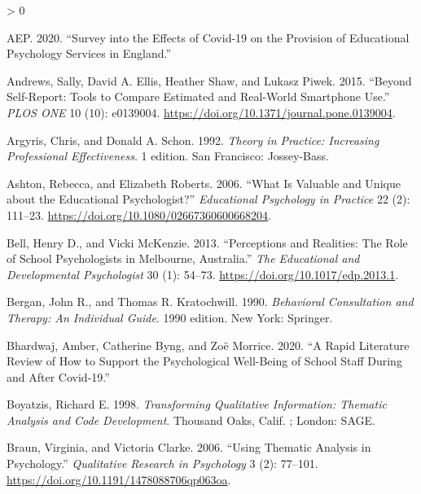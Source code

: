 \documentclass[
]{article}
\newlength{\cslhangindent}
\newenvironment{CSLReferences}[2] %
 {%
  \setlength{\parindent}{0pt}
  \ifodd #1 \everypar{\setlength{\hangindent}{\cslhangindent}}\ignorespaces\fi
  \ifnum #2 > 0
  \setlength{\parskip}{#2\baselineskip}
  \fi
 }%
 {}
\begin{document}
\hypertarget{refs}{}
\begin{CSLReferences}{1}{0}
\leavevmode\hypertarget{ref-aepSurveyEffectsCovid192020}{}%
AEP. 2020. {``Survey into the Effects of {Covid}-19 on the Provision of
Educational Psychology Services in {England}.''}

\leavevmode\hypertarget{ref-andrewsSelfReportToolsCompare2015a}{}%
Andrews, Sally, David A. Ellis, Heather Shaw, and Lukasz Piwek. 2015.
{``Beyond {Self}-{Report}: {Tools} to {Compare Estimated} and
{Real}-{World Smartphone Use}.''} \emph{PLOS ONE} 10 (10): e0139004.
\url{https://doi.org/10.1371/journal.pone.0139004}.

\leavevmode\hypertarget{ref-argyrisTheoryPracticeIncreasing1992}{}%
Argyris, Chris, and Donald A. Schon. 1992. \emph{Theory in {Practice}:
{Increasing Professional Effectiveness}}. 1 edition. {San Francisco}:
{Jossey-Bass}.

\leavevmode\hypertarget{ref-ashtonWhatValuableUnique2006}{}%
Ashton, Rebecca, and Elizabeth Roberts. 2006. {``What Is {Valuable} and
{Unique} about the {Educational Psychologist}?''} \emph{Educational
Psychology in Practice} 22 (2): 111--23.
\url{https://doi.org/10.1080/02667360600668204}.

\leavevmode\hypertarget{ref-bellPerceptionsRealitiesRole2013}{}%
Bell, Henry D., and Vicki McKenzie. 2013. {``Perceptions and
{Realities}: {The Role} of {School Psychologists} in {Melbourne},
{Australia}.''} \emph{The Educational and Developmental Psychologist} 30
(1): 54--73. \url{https://doi.org/10.1017/edp.2013.1}.

\leavevmode\hypertarget{ref-berganBehavioralConsultationTherapy1990}{}%
Bergan, John R., and Thomas R. Kratochwill. 1990. \emph{Behavioral
{Consultation} and {Therapy}: {An Individual Guide}}. 1990 edition. {New
York}: {Springer}.

\leavevmode\hypertarget{ref-bhardwajRapidLiteratureReview2020}{}%
Bhardwaj, Amber, Catherine Byng, and Zoë Morrice. 2020. {``A Rapid
Literature Review of How to Support the Psychological Well-Being of
School Staff During and After {Covid}-19.''}

\leavevmode\hypertarget{ref-boyatzisTransformingQualitativeInformation1998a}{}%
Boyatzis, Richard E. 1998. \emph{Transforming Qualitative Information:
Thematic Analysis and Code Development}. {Thousand Oaks, Calif. ;
London}: {SAGE}.

\leavevmode\hypertarget{ref-braunUsingThematicAnalysis2006}{}%
Braun, Virginia, and Victoria Clarke. 2006. {``Using Thematic Analysis
in Psychology.''} \emph{Qualitative Research in Psychology} 3 (2):
77--101. \url{https://doi.org/10.1191/1478088706qp063oa}.


\end{CSLReferences}
\end{document}
